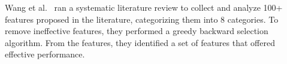 


 Wang et al.~\cite{wang2018there} ran a systematic literature review to collect  and analyze 100+ features proposed in the literature, categorizing them into 8 categories.
To remove ineffective features, they performed a greedy backward selection algorithm.
From the features, they identified a set of features that     offered effective performance.

